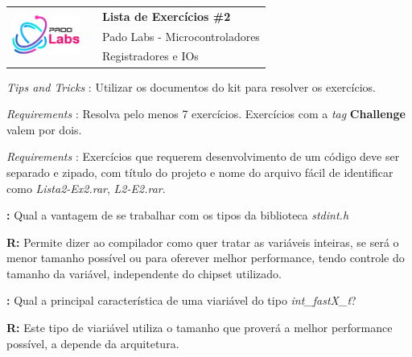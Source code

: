 
\setcounter{idx}{1}

\newcommand{\question}[1]{ 

    \textbf{\theidx : }#1
    \stepcounter{idx}
}

\newcommand{\answer}[1]{

    \ifanswers
    {
        \scriptsize\color{purple}\textbf{R:} #1
    }
    \else
    \vspace{1cm}
    \fi 
}

\begin{tabular}{l|ll}
    \multirow{3}{*}{\includegraphics[width=84px]{fig/logo.png}} & { } & {\LARGE \textbf{Lista de Exercícios \#2 }} \\
    & { } & {\Large Pado Labs - Microcontroladores} \\
    & { } & {Registradores e IOs}   
    \end{tabular}
    
    \vspace{0.5cm}
    \textit{Tips and Tricks} : Utilizar os documentos do kit para resolver os exercícios.

    \textit{Requirements} : Resolva pelo menos 7 exercícios. Exercícios com a \textit{tag} {\color{red}\textbf{Challenge}} valem por dois.
    
    \textit{Requirements} : Exercícios que requerem desenvolvimento de um código deve ser separado e zipado, com título do projeto e nome do arquivo fácil de identificar como \textit{Lista2-Ex2.rar}, \textit{L2-E2.rar}.
    \vspace{0.5cm}

    \question{Qual a vantagem de se trabalhar com os tipos da biblioteca \textit{stdint.h}}

    \answer{Permite dizer ao compilador como quer tratar as variáveis inteiras, se será o menor tamanho possível ou para oferever melhor performance, tendo controle do tamanho da variável, independente do chipset utilizado.}


    \question{Qual a principal característica de uma viariável do tipo \textit{int\_fastX\_t}?}

    \answer{Este tipo de viariável utiliza o tamanho que proverá a melhor performance possível, a depende da arquitetura.}


